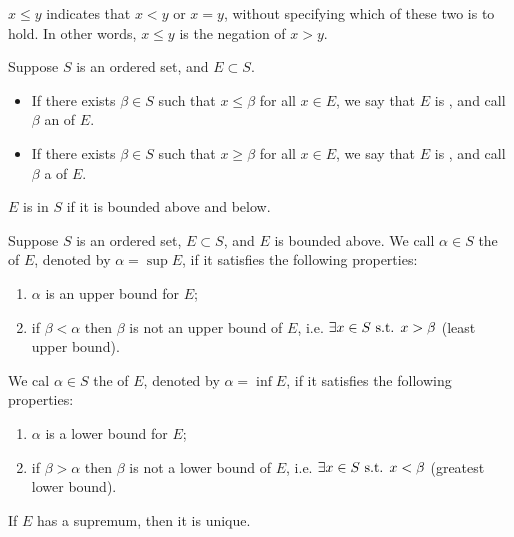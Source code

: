 \begin{notation}
$x \le y$ indicates that $x<y$ or $x=y$, without specifying which of these two is to hold. In other words, $x\le y$ is the negation of $x>y$.
\end{notation}

\begin{definition}[Boundedness]
Suppose $S$ is an ordered set, and $E\subset S$.
\begin{itemize}
\item If there exists $\beta\in S$ such that $x\le\beta$ for all $x\in E$, we say that $E$ is , and call $\beta$ an  of $E$.
\item If there exists $\beta\in S$ such that $x\ge\beta$ for all $x\in E$, we say that $E$ is , and call $\beta$ a  of $E$.
\end{itemize}
$E$ is  in $S$ if it is bounded above and below.
\end{definition}

\begin{definition}[Supremum]
Suppose $S$ is an ordered set, $E\subset S$, and $E$ is bounded above. We call $\alpha\in S$ the  of $E$, denoted by $\alpha=\sup E$, if it satisfies the following properties:
\begin{enumerate}[label=(\roman*)]
\item $\alpha$ is an upper bound for $E$;
\item if $\beta<\alpha$ then $\beta$ is not an upper bound of $E$, i.e. $\exists x\in S\text{ s.t. } x>\beta$ (least upper bound).
\end{enumerate}
\end{definition}

\begin{definition}[Infimum]
We cal $\alpha\in S$ the  of $E$, denoted by $\alpha=\inf E$, if it satisfies the following properties:
\begin{enumerate}[label=(\roman*)]
\item $\alpha$ is a lower bound for $E$;
\item if $\beta>\alpha$ then $\beta$ is not a lower bound of $E$, i.e. $\exists x\in S\text{ s.t. } x<\beta$ (greatest lower bound).
\end{enumerate}
\end{definition}

\begin{proposition}
If $E$ has a supremum, then it is unique.
\end{proposition}

